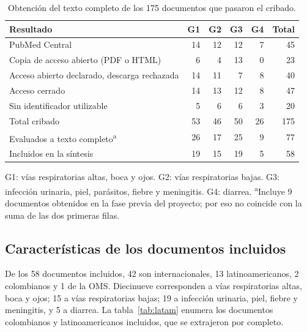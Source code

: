 \documentclass[11pt,a4paper]{article}
\begin{document}
\begin{table}[htbp]
\centering
\caption{Obtención del texto completo de los 175 documentos que pasaron el cribado.}
\label{tab:recuperacion}
\small
\begin{tabular}{@{}lrrrrr@{}}
\toprule
Resultado & G1 & G2 & G3 & G4 & Total \\
\midrule
PubMed Central & 14 & 12 & 12 & 7 & 45 \\
Copia de acceso abierto (PDF o HTML) & 6 & 4 & 13 & 0 & 23 \\
Acceso abierto declarado, descarga rechazada & 14 & 11 & 7 & 8 & 40 \\
Acceso cerrado & 14 & 13 & 12 & 8 & 47 \\
Sin identificador utilizable & 5 & 6 & 6 & 3 & 20 \\
\midrule
Total cribado & 53 & 46 & 50 & 26 & 175 \\
Evaluados a texto completo\textsuperscript{a} & 26 & 17 & 25 & 9 & 77 \\
Incluidos en la síntesis & 19 & 15 & 19 & 5 & 58 \\
\bottomrule
\end{tabular}

\vspace{2pt}
\begin{minipage}{0.92\textwidth}\footnotesize
G1: vías respiratorias altas, boca y ojos. G2: vías respiratorias bajas. G3: infección urinaria, piel, parásitos, fiebre y meningitis. G4: diarrea. \textsuperscript{a}Incluye 9 documentos obtenidos en la fase previa del proyecto; por eso no coincide con la suma de las dos primeras filas.
\end{minipage}
\end{table}

\subsection{Características de los documentos incluidos}

De los 58 documentos incluidos, 42 son internacionales, 13 latinoamericanos, 2 colombianos y 1 de la OMS. Diecinueve corresponden a vías respiratorias altas, boca y ojos; 15 a vías respiratorias bajas; 19 a infección urinaria, piel, fiebre y meningitis, y 5 a diarrea. La tabla~\ref{tab:latam} enumera los documentos colombianos y latinoamericanos incluidos, que se extrajeron por completo.
\end{document}
